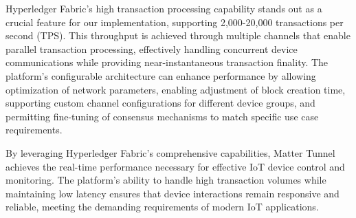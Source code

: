 \documentclass[conference]{IEEEtran}
\begin{document}
\begin{enumerate}[itemsep=2ex, parsep=1ex]
	      Hyperledger Fabric's high transaction processing capability stands out as a crucial feature for our implementation, supporting 2,000-20,000 transactions per second (TPS). This throughput is achieved through multiple channels that enable parallel transaction processing, effectively handling concurrent device communications while providing near-instantaneous transaction finality. The platform's configurable architecture can enhance performance by allowing optimization of network parameters, enabling adjustment of block creation time, supporting custom channel configurations for different device groups, and permitting fine-tuning of consensus mechanisms to match specific use case requirements.
	      
	      By leveraging Hyperledger Fabric's comprehensive capabilities, Matter Tunnel achieves the real-time performance necessary for effective IoT device control and monitoring. The platform's ability to handle high transaction volumes while maintaining low latency ensures that device interactions remain responsive and reliable, meeting the demanding requirements of modern IoT applications.
	      
\end{enumerate}
\end{document}
